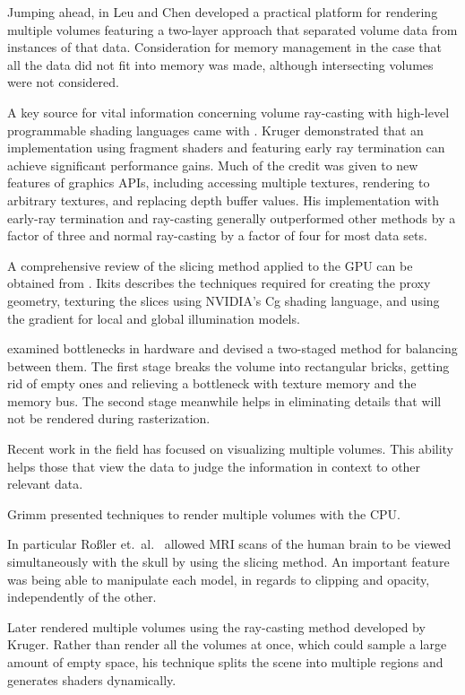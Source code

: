 \documentclass{article}
\begin{document}
Jumping ahead, in \cite{Leu99} Leu and Chen developed a practical platform for
rendering multiple volumes featuring a two-layer approach that separated volume
data from instances of that data.  Consideration for memory management in the
case that all the data did not fit into memory was made, although intersecting
volumes were not considered.

A key source for vital information concerning volume ray-casting with high-level
programmable shading languages came with \cite{Kruger03}.  Kruger demonstrated
that an implementation using fragment shaders and featuring early ray
termination can achieve significant performance gains.  Much of the credit was
given to new features of graphics APIs, including accessing multiple textures,
rendering to arbitrary textures, and replacing depth buffer values.  His
implementation with early-ray termination and ray-casting generally outperformed
other methods by a factor of three and normal ray-casting by a factor of four
for most data sets.

A comprehensive review of the slicing method applied to the GPU can be obtained
from \cite{Ikits04}.  Ikits describes the techniques required for creating the
proxy geometry, texturing the slices using NVIDIA’s Cg shading language, and
using the gradient for local and global illumination models.

\cite{Ruijters06} examined bottlenecks in hardware and devised a two-staged
method for balancing between them.  The first stage breaks the volume into
rectangular bricks, getting rid of empty ones and relieving a bottleneck with
texture memory and the memory bus.  The second stage meanwhile helps in
eliminating details that will not be rendered during rasterization.

Recent work in the field has focused on visualizing multiple volumes.  This
ability helps those that view the data to judge the information in context to
other relevant data.

Grimm \cite{Grimm04} presented techniques to render multiple volumes with the
CPU.

In particular Roßler et.\ al.\ \cite{Rossler06} allowed MRI scans of the human
brain to be viewed simultaneously with the skull by using the slicing method.
An important feature was being able to manipulate each model, in regards to
clipping and opacity, independently of the other.

Later \cite{Rossler08} rendered multiple volumes using the ray-casting method
developed by Kruger.  Rather than render all the volumes at once, which could
sample a large amount of empty space, his technique splits the scene into
multiple regions and generates shaders dynamically.
\end{document}
